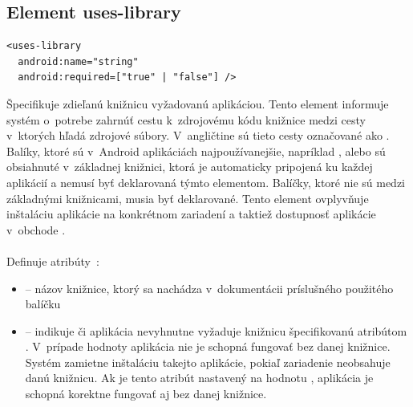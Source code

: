 \subsection{Element uses-library}
\lstset{language=XML}
\begin{lstlisting}
<uses-library
  android:name="string"
  android:required=["true" | "false"] />
\end{lstlisting}
Špecifikuje zdieľanú knižnicu vyžadovanú aplikáciou. Tento element informuje systém o~potrebe zahrnúť cestu k~zdrojovému kódu knižnice medzi cesty v~ktorých  hľadá zdrojové súbory. V~angličtine sú tieto cesty označované ako . Balíky, ktoré sú v~Android aplikáciách najpoužívanejšie, napríklad ,  alebo  sú obsiahnuté v~základnej knižnici, ktorá je automaticky pripojená ku každej aplikácií a nemusí byť deklarovaná týmto elementom. Balíčky, ktoré nie sú medzi základnými knižnicami, musia byť deklarované.  Tento element ovplyvňuje inštaláciu aplikácie na konkrétnom zariadení a taktiež dostupnosť aplikácie v~obchode .\\\\ Definuje atribúty~\cite{elUsesLib}:\\
\begin{itemize}
\item {} -- názov knižnice, ktorý sa nachádza v~dokumentácii príslušného použitého balíčku
\item {} -- indikuje či aplikácia nevyhnutne vyžaduje knižnicu špecifikovanú atribútom . V~prípade hodnoty  aplikácia nie je schopná fungovať bez danej knižnice. Systém zamietne inštaláciu takejto aplikácie, pokiaľ zariadenie neobsahuje danú knižnicu. Ak je tento atribút nastavený na hodnotu , aplikácia je schopná korektne fungovať aj bez danej knižnice.
\end{itemize}